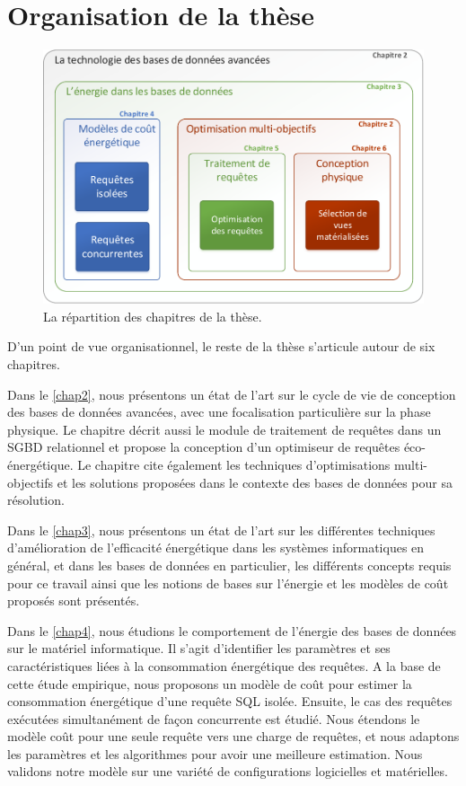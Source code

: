 \section{Organisation de la thèse}

\begin{figure}
	\begin{center}
		\includegraphics[scale=0.7]{chapitre1/chap1Fig/chapters-org2.pdf}
		\caption{La répartition des chapitres de la thèse.}\label{fig:chapitres}
	\end{center}
\end{figure} 

D'un point de vue organisationnel, le reste de la thèse s'articule autour de six chapitres.

Dans le \ref{chap2}, nous présentons un état de l'art sur le cycle de vie de conception des bases de données avancées, avec une focalisation particulière sur la phase physique. Le chapitre décrit aussi le module de traitement de requêtes dans un SGBD relationnel et propose la conception d'un optimiseur de requêtes éco-énergétique. Le chapitre cite également les techniques d'optimisations multi-objectifs et les solutions proposées dans le contexte des bases de données pour sa résolution.

Dans le \ref{chap3}, nous présentons un état de l'art sur les différentes techniques d'amélioration de l'efficacité énergétique dans les systèmes informatiques en général, et dans les bases de données en particulier, les différents concepts requis pour ce travail ainsi que les notions de bases sur l'énergie et les modèles de coût proposés sont présentés.

Dans le \ref{chap4}, nous étudions le comportement de l'énergie des bases de données sur le matériel informatique. Il s'agit d'identifier les paramètres et ses caractéristiques liées à la consommation énergétique des requêtes. A la base de cette étude empirique, nous proposons un modèle de coût pour estimer la consommation énergétique d'une requête SQL isolée. Ensuite, le cas des requêtes exécutées simultanément de façon concurrente est étudié. Nous étendons le modèle coût pour une seule requête vers une charge de requêtes, et nous adaptons les paramètres et les algorithmes pour avoir une meilleure estimation. Nous validons notre modèle sur une variété de configurations logicielles et matérielles. 

